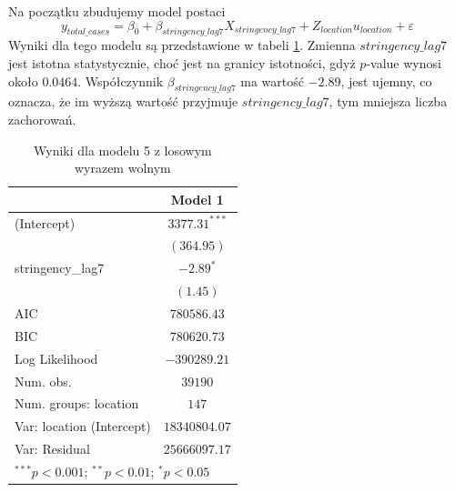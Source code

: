 \documentclass[12pt]{mwbk}
\theoremstyle{plain}
\theoremstyle{definition}
\theoremstyle{remark}
\begin{document}
Na początku zbudujemy model postaci
$$y_{total\_cases}=\beta_0+\beta_{stringency\_lag7} X_{stringency\_lag7}+Z_{location}u_{location}+\varepsilon$$
Wyniki dla tego modelu są przedstawione w tabeli \ref{table:mod5-intercept}. Zmienna $stringency\_lag7$ jest istotna statystycznie, choć jest na granicy istotności, gdyż $p$-value wynosi około $0.0464$. Współczynnik $\beta_{stringency\_lag7}$ ma wartość $-2.89$, jest ujemny, co oznacza, że im wyższą wartość przyjmuje $stringency\_lag7$, tym mniejsza liczba zachorowań.
\newpage
\begin{table}[!htbp]
	\begin{center}
		\begin{tabular}{l c}
			\hline
			& Model 1 \\
			\hline
			(Intercept)               & $3377.31^{***}$ \\
			& $(364.95)$      \\
			stringency\_lag7          & $-2.89^{*}$     \\
			& $(1.45)$        \\
			\hline
			AIC                       & $780586.43$     \\
			BIC                       & $780620.73$     \\
			Log Likelihood            & $-390289.21$    \\
			Num. obs.                 & $39190$         \\
			Num. groups: location     & $147$           \\
			Var: location (Intercept) & $18340804.07$   \\
			Var: Residual             & $25666097.17$   \\
			\hline
			\multicolumn{2}{l}{\scriptsize{$^{***}p<0.001$; $^{**}p<0.01$; $^{*}p<0.05$}}
		\end{tabular}
		\caption{Wyniki dla modelu 5 z losowym wyrazem wolnym}
		\label{table:mod5-intercept}
	\end{center}
\end{table}
\end{document}
